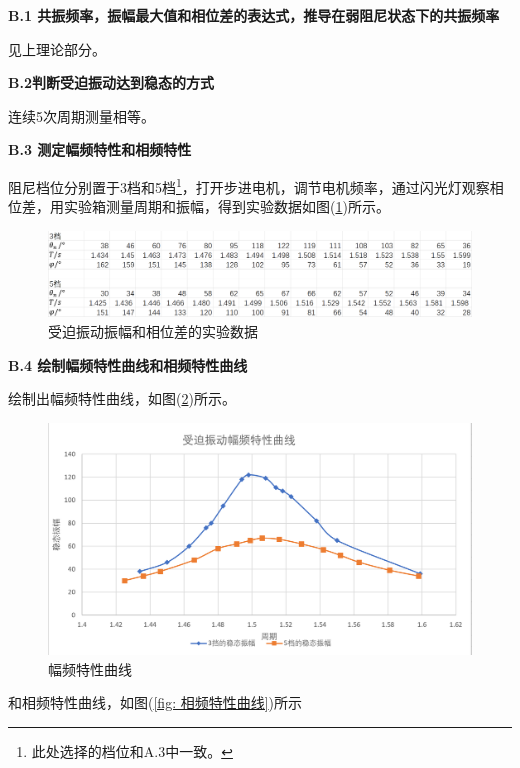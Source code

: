 \documentclass[a4paper,11pt]{article}
\begin{document}
        \textbf{B.1 共振频率，振幅最大值和相位差的表达式，推导在弱阻尼状态下的共振频率}

        见上理论部分。

        \textbf{B.2判断受迫振动达到稳态的方式}

        连续5次周期测量相等。

        \textbf{B.3 测定幅频特性和相频特性}

        阻尼档位分别置于3档和5档\footnote{此处选择的档位和A.3中一致。}，打开步进电机，调节电机频率，通过闪光灯观察相位差，用实验箱测量周期和振幅，得到实验数据如图(\ref{fig: 幅频相频数据})所示。

        \begin{figure}[ht]
            \centering
            \includegraphics[scale=0.5]{幅频相频数据.png}
            \caption{受迫振动振幅和相位差的实验数据}
            \label{fig: 幅频相频数据}
        \end{figure}

        \textbf{B.4 绘制幅频特性曲线和相频特性曲线}

        绘制出幅频特性曲线，如图(\ref{fig: 幅频特性曲线})所示。

        \begin{figure}[ht]
            \centering
            \includegraphics[scale=0.5]{幅频特性曲线.png}
            \caption{幅频特性曲线}
            \label{fig: 幅频特性曲线}
        \end{figure}

        和相频特性曲线，如图(\ref{fig: 相频特性曲线})所示
\end{document}
